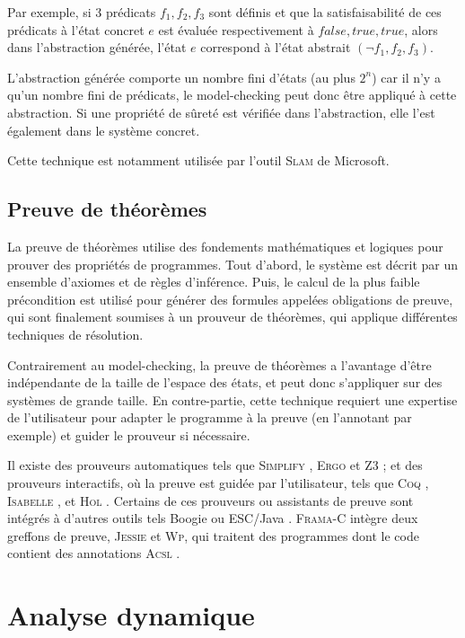 \documentclass[french]{spimufcphdthesis}
\begin{document}
Par exemple, si 3 prédicats $f_1, f_2, f_3$ sont définis et que la
satisfaisabilité de ces prédicats à l'état concret $e$ est évaluée
respectivement à $false, true, true$, alors dans l'abstraction générée, l'état
$e$ correspond à l'état abstrait $(\lnot f_1, f_2, f_3)$.

L'abstraction générée comporte un nombre fini d'états (au plus $2^n$) car il n'y
a qu'un nombre fini de prédicats, le model-checking peut donc être appliqué à
cette abstraction. Si une propriété de sûreté est vérifiée dans l'abstraction,
elle l'est également dans le système concret.

Cette technique est notamment utilisée par l'outil \textsc{Slam} \cite{SLAM} de
Microsoft.


\subsection{Preuve de théorèmes}
\label{sec:preuve}

La preuve de théorèmes utilise des fondements mathématiques et logiques
\cite{Hoare} pour prouver des propriétés de programmes. Tout d'abord, le système
est décrit par un ensemble d'axiomes et de règles d'inférence. Puis, le calcul
de la plus faible précondition \cite{Dijkstra} est utilisé pour générer des
formules appelées obligations de preuve, qui sont finalement soumises à un
prouveur de théorèmes, qui applique différentes techniques de résolution.

Contrairement au model-checking, la preuve de théorèmes a l'avantage d'être
indépendante de la taille de l'espace des états, et peut donc s'appliquer sur
des systèmes de grande taille. En contre-partie, cette technique requiert une
expertise de l'utilisateur pour adapter le programme à la preuve (en l'annotant
par exemple) et guider le prouveur si nécessaire.

Il existe des prouveurs automatiques tels que \textsc{Simplify}
\cite{Simplify}, \textsc{Ergo} \cite{Ergo} et \textsc{Z3} \cite{Z3}; et des
prouveurs interactifs, où la preuve est guidée par l'utilisateur, tels que
\textsc{Coq} \cite{Coq}, \textsc{Isabelle} \cite{Isabelle}, et \textsc{Hol}
\cite{HOL}. Certains de ces prouveurs ou assistants de preuve sont intégrés à
d'autres outils tels Boogie \cite{Boogie} ou ESC/Java \cite{ESC/Java}.
\textsc{Frama-C} intègre deux greffons de preuve, \textsc{Jessie} et
\textsc{Wp}, qui traitent des programmes dont le code contient des annotations
\textsc{Acsl} \cite{ACSL}.


\section{Analyse dynamique}
\label{sec:AD}
\end{document}
